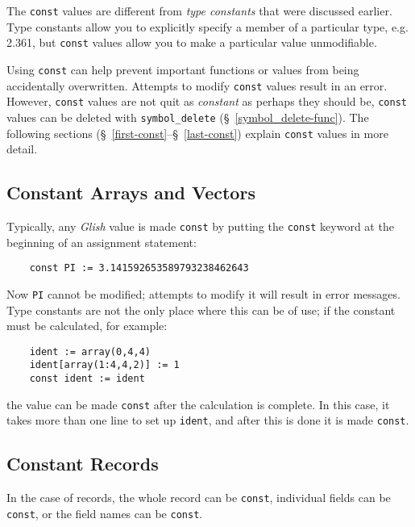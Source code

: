 The {\tt const} values are different from {\em type constants} that
were discussed
earlier. Type constants allow you to explicitly specify a member of a
particular type, e.g. 2.361, but {\tt const}
values allow you to make a particular value unmodifiable. 

Using {\tt const} can help prevent important functions or values from being
accidentally overwritten. Attempts to modify {\tt const} values result in
an error. However, {\tt const} values are not quit as {\em constant} as
perhaps they should be, {\tt const} values can be deleted with {\tt symbol\_delete}
(\S~\ref{symbol_delete-func}).
The following sections (\S~\ref{first-const}--\S~\ref{last-const})
explain {\tt const} values in more detail.

\subsection{Constant Arrays and Vectors}
\label{first-const}

Typically, any {\em Glish} value is made {\tt const} by putting the {\tt const}
keyword at the beginning of an assignment statement:
\begin{verbatim}
    const PI := 3.141592653589793238462643
\end{verbatim}
Now  {\tt PI} cannot be modified; attempts to modify it will result
in error messages. Type constants are not the only place where this can be
of use; if the constant must be calculated, for example:
\begin{verbatim}
    ident := array(0,4,4)
    ident[array(1:4,4,2)] := 1
    const ident := ident
\end{verbatim}
the value can be made {\tt const} after the calculation is complete. In this
case, it
takes more than one line to set up {\tt ident}, and after this is done it
is made {\tt const}.


\subsection{Constant Records}
\label{const-record}

In the case of records, the whole record can be {\tt const},
individual fields can be {\tt const}, or the field names can be {\tt const}.

